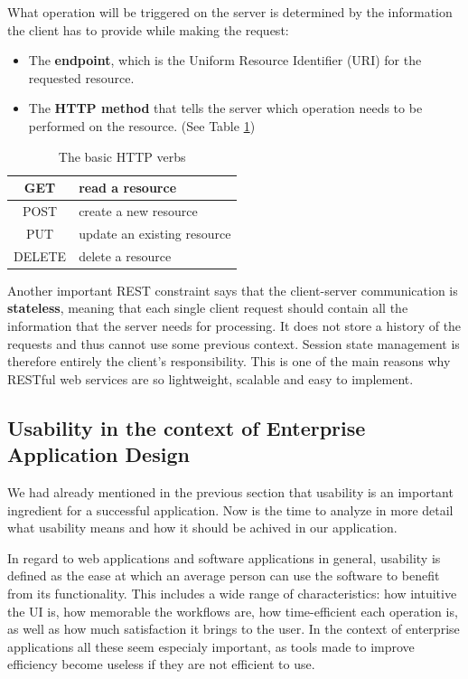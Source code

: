 What operation will be triggered on the server is determined by the information the client has to provide while making the request:

\begin{itemize}
  \item The \textbf{endpoint}, which is the Uniform Resource Identifier (URI) for the requested resource.
  \item The \textbf{HTTP method} that tells the server which operation needs to be performed on the resource. (See Table \ref{httpVerbs})
\end{itemize}

\begin{table}[H]
  \centering
  \begin{tabular}{|c|l|}
    \hline
    GET    & read a resource             \\ \hline
    POST   & create a new resource       \\ \hline
    PUT    & update an existing resource \\ \hline
    DELETE & delete a resource           \\ \hline
  \end{tabular}
  \caption{The basic HTTP verbs}
  \label{httpVerbs}
\end{table}

Another important REST constraint says that the client-server communication is \textbf{stateless}, meaning that each single client request should contain all the information that the server needs for processing. It does not store a history of the requests and thus cannot use some previous context. Session state management is therefore entirely the client's responsibility. This is one of the main reasons why RESTful web services are so lightweight, scalable and easy to implement.


\subsection{Usability in the context of Enterprise Application Design}
\label{subsection:usability}

We had already mentioned in the previous section that usability is an important ingredient for a successful application. Now is the time to analyze in more detail what usability means and how it should be achived in our application.

In regard to web applications and software applications in general, usability is defined as the ease at which an average person can use the software to benefit from its functionality. This includes a wide range of characteristics: how intuitive the UI is, how memorable the workflows are, how time-efficient each operation is, as well as how much satisfaction it brings to the user. In the context of enterprise applications all these seem especialy important, as tools made to improve efficiency become useless if they are not efficient to use.

